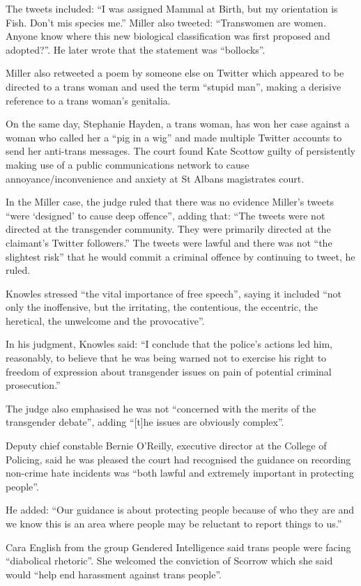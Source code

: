 The tweets included: “I was assigned Mammal at Birth, but my orientation is Fish. Don’t mis species me.” Miller also tweeted: “Transwomen are women. Anyone know where this new biological classification was first proposed and adopted?”. He later wrote that the statement was “bollocks”.

Miller also retweeted a poem by someone else on Twitter which appeared to be directed to a trans woman and used the term “stupid man”, making a derisive reference to a trans woman’s genitalia.

On the same day, Stephanie Hayden, a trans woman, has won her case against a woman who called her a “pig in a wig” and made multiple Twitter accounts to send her anti-trans messages. The court found Kate Scottow guilty of persistently making use of a public communications network to cause annoyance/inconvenience and anxiety at St Albans magistrates court.

In the Miller case, the judge ruled that there was no evidence Miller’s tweets “were ‘designed’ to cause deep offence”, adding that: “The tweets were not directed at the transgender community. They were primarily directed at the claimant’s Twitter followers.” The tweets were lawful and there was not “the slightest risk” that he would commit a criminal offence by continuing to tweet, he ruled.

Knowles stressed “the vital importance of free speech”, saying it included “not only the inoffensive, but the irritating, the contentious, the eccentric, the heretical, the unwelcome and the provocative”.

In his judgment, Knowles said: “I conclude that the police’s actions led him, reasonably, to believe that he was being warned not to exercise his right to freedom of expression about transgender issues on pain of potential criminal prosecution.”

The judge also emphasised he was not “concerned with the merits of the transgender debate”, adding “[t]he issues are obviously complex”.

Deputy chief constable Bernie O’Reilly, executive director at the College of Policing, said he was pleased the court had recognised the guidance on recording non-crime hate incidents was “both lawful and extremely important in protecting people”.

He added: “Our guidance is about protecting people because of who they are and we know this is an area where people may be reluctant to report things to us.”

Cara English from the group Gendered Intelligence said trans people were facing “diabolical rhetoric”. She welcomed the conviction of Scorrow which she said would “help end harassment against trans people”.

